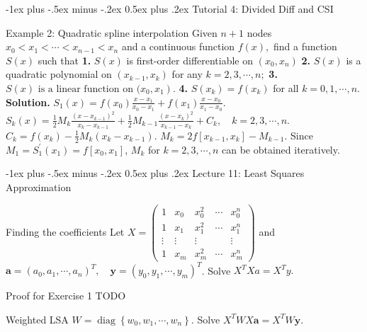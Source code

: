 \documentclass[10pt,landscape]{article}
\makeatletter
\renewcommand{\section}{\@startsection{section}{1}{0mm}%
                                {-1ex plus -.5ex minus -.2ex}%
                                {0.5ex plus .2ex}%
                                {\normalfont\large\bfseries}}
\theoremstyle{definition}
\newcommand{\thistheoremname}{}
\newtheorem*{genericthm*}{\thistheoremname}
\newenvironment{namedthm*}[1]
{\renewcommand{\thistheoremname}{#1}\begin{genericthm*}}
{\end{genericthm*}}
\makeatother
\begin{document}
\begin{multicols}{3}
	\section{Tutorial 4: Divided Diff and CSI}
	\begin{namedthm*}{Example 2: Quadratic spline interpolation}
		Given \(n+1\) nodes \(x_{0}<x_{1}<\cdots<x_{n-1}<x_{n}\) and a continuous function \(f(x),\)
		find a function \(S(x)\) such that
		\textbf{1.} \(S(x)\) is first-order differentiable on \(\left(x_{0}, x_{n}\right)\)
		\textbf{2.} \(S(x)\) is a quadratic polynomial on \(\left(x_{k-1}, x_{k}\right)\) for any \(k=2,3, \cdots, n ;\)
		\textbf{3.} \(\left.S(x) \text { is a linear function on (} x_{0}, x_{1}\right)\). \textbf{4.} \(S\left(x_{k}\right)=f\left(x_{k}\right)\) for all \(k=0,1, \cdots, n\).
		\\\textbf{Solution.} \(S_{1}(x)=f\left(x_{0}\right) \frac{x-x_{1}}{x_{0}-x_{1}}+f\left(x_{1}\right) \frac{x-x_{0}}{x_{1}-x_{0}}\). \(S_{k}(x)=\frac{1}{2} M_{k} \frac{\left(x-x_{k-1}\right)^{2}}{x_{k}-x_{k-1}}+\frac{1}{2} M_{k-1} \frac{\left(x-x_{k}\right)^{2}}{x_{k-1}-x_{k}}+C_{k}, \quad k=2,3, \cdots, n.\)\\\(C_{k}=f\left(x_{k}\right)-\frac{1}{2} M_{k}\left(x_{k}-x_{k-1}\right)\). \(M_{k}=2 f\left[x_{k-1}, x_{k}\right]-M_{k-1}\). Since \(M_{1}=S_{1}^{\prime}\left(x_{1}\right)=f\left[x_{0}, x_{1}\right]\), \(M_{k}\) for \(k=2,3, \cdots, n\) can be obtained iteratively.
	\end{namedthm*}
	\section{Lecture 11: Least Squares Approximation}
	\begin{namedthm*}{Finding the coefficients}
		Let \(X=\left(\begin{array}{ccccc}{1} & {x_{0}} & {x_{0}^{2}} & {\cdots} & {x_{0}^{n}} \\ {1} & {x_{1}} & {x_{1}^{2}} & {\cdots} & {x_{1}^{n}} \\ {\vdots} & {\vdots} & {\vdots} & {} & {\vdots} \\ {1} & {x_{m}} & {x_{m}^{2}} & {\cdots} & {x_{m}^{n}}\end{array}\right)\) and
		\\ \(\mathbf{a}=\left(a_{0}, a_{1}, \cdots, a_{n}\right)^{T}, \quad \mathbf{y}=\left(y_{0}, y_{1}, \cdots, y_{m}\right)^{T}\). Solve \(X^TXa = X^Ty.\)
	\end{namedthm*}

	\begin{namedthm*}{Proof for Exercise 1}
		\color{red} TODO
	\end{namedthm*}
	\begin{namedthm*}{Weighted LSA}
		\(W=\operatorname{diag}\left\{w_{0}, w_{1}, \cdots, w_{n}\right\}\). Solve \(X^{T} W X \mathbf{a}=X^{T} W \mathbf{y}\).
	\end{namedthm*}

\end{multicols}
\end{document}
